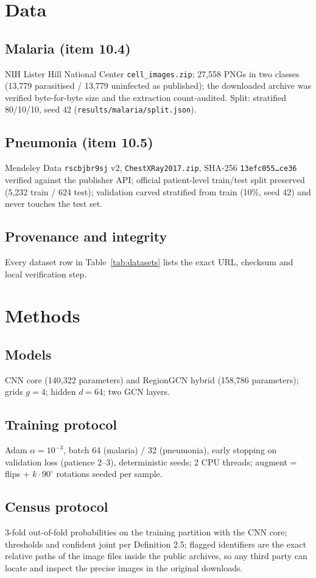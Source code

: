 \documentclass[11pt]{article}
\theoremstyle{definition}
\begin{document}
\section{Data}
\subsection{Malaria (item 10.4)}
NIH Lister Hill National Center \texttt{cell\_images.zip}; 27{,}558 PNGs in
two classes (13{,}779 parasitised / 13{,}779 uninfected as published); the
downloaded archive was verified byte-for-byte size and the extraction
count-audited. Split: stratified 80/10/10, seed 42
(\texttt{results/malaria/split.json}).
\subsection{Pneumonia (item 10.5)}
Mendeley Data \texttt{rscbjbr9sj} v2, \texttt{ChestXRay2017.zip},
SHA-256 \texttt{13efc055\dots ce36} verified against the publisher API;
official patient-level train/test split preserved (5{,}232 train / 624
test); validation carved stratified from train (10\%, seed 42) and never
touches the test set.
\subsection{Provenance and integrity}
Every dataset row in Table~\ref{tab:datasets} lists the exact URL, checksum
and local verification step.

\section{Methods}
\subsection{Models} CNN core (140{,}322 parameters) and RegionGCN hybrid
(158{,}786 parameters); grids $g{=}4$; hidden $d{=}64$; two GCN layers.
\subsection{Training protocol} Adam $\alpha{=}10^{-3}$, batch 64 (malaria) /
32 (pneumonia), early stopping on validation loss (patience 2--3),
deterministic seeds; 2 CPU threads; augment = flips + $k\cdot90^\circ$
rotations seeded per sample.
\subsection{Census protocol} 3-fold out-of-fold probabilities on the training
partition with the CNN core; thresholds and confident joint per Definition
2.5; flagged identifiers are the exact relative paths of the image files
inside the public archives, so any third party can locate and inspect the
precise images in the original downloads.
\end{document}
